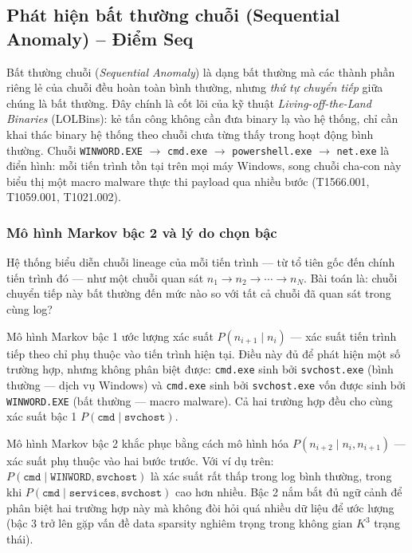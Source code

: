\documentclass[../main.tex]{subfiles}
\begin{document}
\subsection{Phát hiện bất thường chuỗi (Sequential Anomaly) – Điểm Seq}
\label{subsection:2.4.4}

Bất thường chuỗi (\textit{Sequential Anomaly}) là dạng bất thường mà các thành phần riêng lẻ của chuỗi đều hoàn toàn bình thường, nhưng \textit{thứ tự chuyển tiếp} giữa chúng là bất thường. Đây chính là cốt lõi của kỹ thuật \textit{Living-off-the-Land Binaries} (LOLBins): kẻ tấn công không cần đưa binary lạ vào hệ thống, chỉ cần khai thác binary hệ thống theo chuỗi chưa từng thấy trong hoạt động bình thường. Chuỗi \texttt{WINWORD.EXE} $\to$ \texttt{cmd.exe} $\to$ \texttt{powershell.exe} $\to$ \texttt{net.exe} là điển hình: mỗi tiến trình tồn tại trên mọi máy Windows, song chuỗi cha-con này biểu thị một macro malware thực thi payload qua nhiều bước (T1566.001, T1059.001, T1021.002).

\subsubsection{Mô hình Markov bậc 2 và lý do chọn bậc}
\label{subsubsection:2.4.4.1}

Hệ thống biểu diễn chuỗi lineage của mỗi tiến trình — từ tổ tiên gốc đến chính tiến trình đó — như một chuỗi quan sát $n_1 \to n_2 \to \cdots \to n_N$. Bài toán là: chuỗi chuyển tiếp này bất thường đến mức nào so với tất cả chuỗi đã quan sát trong cùng log?

Mô hình Markov bậc 1 ước lượng xác suất $P(n_{i+1} \mid n_i)$ — xác suất tiến trình tiếp theo chỉ phụ thuộc vào tiến trình hiện tại. Điều này đủ để phát hiện một số trường hợp, nhưng không phân biệt được: \texttt{cmd.exe} sinh bởi \texttt{svchost.exe} (bình thường — dịch vụ Windows) và \texttt{cmd.exe} sinh bởi \texttt{svchost.exe} vốn được sinh bởi \texttt{WINWORD.EXE} (bất thường — macro malware). Cả hai trường hợp đều cho cùng xác suất bậc 1 $P(\texttt{cmd} \mid \texttt{svchost})$.

Mô hình Markov bậc 2 khắc phục bằng cách mô hình hóa $P(n_{i+2} \mid n_i, n_{i+1})$ — xác suất phụ thuộc vào hai bước trước. Với ví dụ trên: $P(\texttt{cmd} \mid \texttt{WINWORD}, \texttt{svchost})$ là xác suất rất thấp trong log bình thường, trong khi $P(\texttt{cmd} \mid \texttt{services}, \texttt{svchost})$ cao hơn nhiều. Bậc 2 nắm bắt đủ ngữ cảnh để phân biệt hai trường hợp này mà không đòi hỏi quá nhiều dữ liệu để ước lượng (bậc 3 trở lên gặp vấn đề data sparsity nghiêm trọng trong không gian $K^3$ trạng thái).
\end{document}
